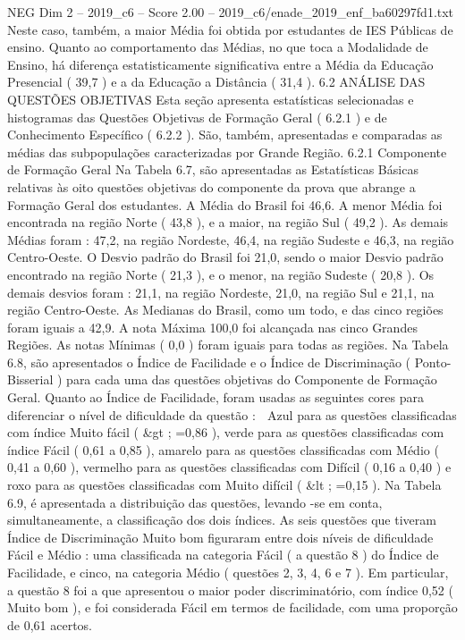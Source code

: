 \begin{textsample}{NEG Dim 2 – 2019\_c6 – Score 2.00 – 2019\_c6/enade\_2019\_enf\_ba60297fd1.txt}
Neste caso, também, a maior Média foi obtida por estudantes de IES Públicas de ensino.
Quanto ao comportamento das Médias, no que toca a Modalidade de Ensino, há diferença estatisticamente significativa entre a Média da Educação Presencial ( 39,7 ) e a da Educação a Distância ( 31,4 ). 6.2 ANÁLISE DAS QUESTÕES OBJETIVAS Esta seção apresenta estatísticas selecionadas e histogramas das Questões Objetivas de Formação Geral ( 6.2.1 ) e de Conhecimento Específico ( 6.2.2 ).
São, também, apresentadas e comparadas as médias das subpopulações caracterizadas por Grande Região. 6.2.1 Componente de Formação Geral Na Tabela 6.7, são apresentadas as Estatísticas Básicas relativas às oito questões objetivas do componente da prova que abrange a Formação Geral dos estudantes.
A Média do Brasil foi 46,6.
A menor Média foi encontrada na região Norte ( 43,8 ), e a maior, na região Sul ( 49,2 ).
As demais Médias foram : 47,2, na região Nordeste, 46,4, na região Sudeste e 46,3, na região Centro-Oeste.
O Desvio padrão do Brasil foi 21,0, sendo o maior Desvio padrão encontrado na região Norte ( 21,3 ), e o menor, na região Sudeste ( 20,8 ).
Os demais desvios foram : 21,1, na região Nordeste, 21,0, na região Sul e 21,1, na região Centro-Oeste.
As Medianas do Brasil, como um todo, e das cinco regiões foram iguais a 42,9.
A nota Máxima 100,0 foi alcançada nas cinco Grandes Regiões.
As notas Mínimas ( 0,0 ) foram iguais para todas as regiões.
Na Tabela 6.8, são apresentados o Índice de Facilidade e o Índice de Discriminação ( Ponto-Bisserial ) para cada uma das questões objetivas do Componente de Formação Geral.
Quanto ao Índice de Facilidade, foram usadas as seguintes cores para diferenciar o nível de dificuldade da questão :  Azul para as questões classificadas com índice Muito fácil ( \&gt ; =0,86 ), verde para as questões classificadas com índice Fácil ( 0,61 a 0,85 ), amarelo para as questões classificadas com Médio ( 0,41 a 0,60 ), vermelho para as questões classificadas com Difícil ( 0,16 a 0,40 ) e roxo para as questões classificadas com Muito difícil ( \&lt ; =0,15 ).
Na Tabela 6.9, é apresentada a distribuição das questões, levando -se em conta, simultaneamente, a classificação dos dois índices.
As seis questões que tiveram Índice de Discriminação Muito bom figuraram entre dois níveis de dificuldade Fácil e Médio : uma classificada na categoria Fácil ( a questão 8 ) do Índice de Facilidade, e cinco, na categoria Médio ( questões 2, 3, 4, 6 e 7 ).
Em particular, a questão 8 foi a que apresentou o maior poder discriminatório, com índice 0,52 ( Muito bom ), e foi considerada Fácil em termos de facilidade, com uma proporção de 0,61 acertos.

\end{textsample}
